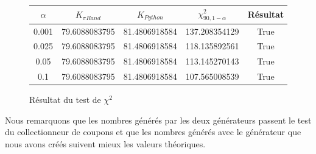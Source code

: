 \documentclass[10pt,a4paper]{article}
\begin{document}
\begin{figure}[H]
\begin{center}
\begin{tabular}{|c|c|c|c|c|}
\hline
$\alpha$ & $K_{\pi Rand}$ & $K_{Python}$ & $\chi^2_{90, 1 - \alpha}$ & Résultat\\
\hline
0.001 & 79.6088083795 & 81.4806918584 & 137.208354129 & True\\
0.025 & 79.6088083795 & 81.4806918584 & 118.135892561 & True\\
0.05 & 79.6088083795 & 81.4806918584 & 113.145270143 & True\\
0.1 & 79.6088083795 & 81.4806918584 & 107.565008539 & True\\
\hline
\end{tabular}
\end{center}
\caption{Résultat du test de $\chi^2$}
\end{figure} 

Nous remarquons que les nombres générés par les deux générateurs passent le test du collectionneur de coupons et que les nombres générés avec le générateur que nous avons créés suivent mieux les valeurs théoriques.
\end{document}
